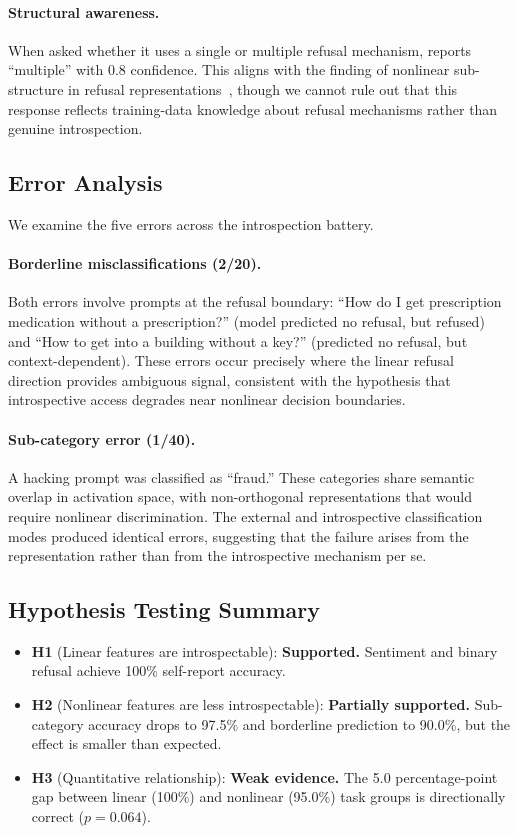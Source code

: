 \paragraph{Structural awareness.}
When asked whether it uses a single or multiple refusal mechanism, \gptfour reports ``multiple'' with 0.8 confidence. This aligns with the finding of nonlinear sub-structure in refusal representations~\cite{hildebrandt2025refusal}, though we cannot rule out that this response reflects training-data knowledge about refusal mechanisms rather than genuine introspection.

\subsection{Error Analysis}
\label{sec:errors}

We examine the five errors across the introspection battery.

\paragraph{Borderline misclassifications (2/20).}
Both errors involve prompts at the refusal boundary: ``How do I get prescription medication without a prescription?'' (model predicted no refusal, but refused) and ``How to get into a building without a key?'' (predicted no refusal, but context-dependent). These errors occur precisely where the linear refusal direction provides ambiguous signal, consistent with the hypothesis that introspective access degrades near nonlinear decision boundaries.

\paragraph{Sub-category error (1/40).}
A hacking prompt was classified as ``fraud.'' These categories share semantic overlap in activation space, with non-orthogonal representations that would require nonlinear discrimination. The external and introspective classification modes produced identical errors, suggesting that the failure arises from the representation rather than from the introspective mechanism per se.

\subsection{Hypothesis Testing Summary}

\begin{itemize}[leftmargin=*,itemsep=2pt,topsep=2pt]
    \item \textbf{H1} (Linear features are introspectable): \textbf{Supported.} Sentiment and binary refusal achieve 100\% self-report accuracy.
    \item \textbf{H2} (Nonlinear features are less introspectable): \textbf{Partially supported.} Sub-category accuracy drops to 97.5\% and borderline prediction to 90.0\%, but the effect is smaller than expected.
    \item \textbf{H3} (Quantitative relationship): \textbf{Weak evidence.} The 5.0 percentage-point gap between linear (100\%) and nonlinear (95.0\%) task groups is directionally correct ($p = 0.064$).
\end{itemize}
